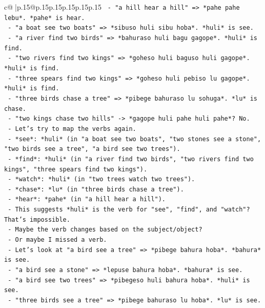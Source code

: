 \documentclass{article}
\begin{document}
{\begin{supertabular}{c@{$\;$}|p{.15\linewidth}@{}p{.15\linewidth}p{.15\linewidth}p{.15\linewidth}p{.15\linewidth}p{.15\linewidth}}
{{{\texttt{            {-} "a hill hear a hill" => *pahe pahe lebu*. *pahe* is hear.} \\
\texttt{            {-} "a boat see two boats" => *sibuso huli sibu hoba*. *huli* is see.} \\
\texttt{            {-} "a river find two birds" => *bahuraso huli bagu gagope*. *huli* is find.} \\
\texttt{            {-} "two rivers find two kings" => *goheso huli baguso huli gagope*. *huli* is find.} \\
\texttt{            {-} "three spears find two kings" => *goheso huli pebiso lu gagope*. *huli* is find.} \\
\texttt{            {-} "three birds chase a tree" => *pibege bahuraso lu sohuga*. *lu* is chase.} \\
\texttt{            {-} "two kings chase two hills" {-}> *gagope huli pahe huli pahe*? No.} \\
\texttt{            {-} Let's try to map the verbs again.} \\
\texttt{              {-} *see*: *huli* (in "a boat see two boats", "two stones see a stone", "two birds see a tree", "a bird see two trees").} \\
\texttt{              {-} *find*: *huli* (in "a river find two birds", "two rivers find two kings", "three spears find two kings").} \\
\texttt{              {-} *watch*: *huli* (in "two trees watch two trees").} \\
\texttt{              {-} *chase*: *lu* (in "three birds chase a tree").} \\
\texttt{              {-} *hear*: *pahe* (in "a hill hear a hill").} \\
\texttt{              {-} This suggests *huli* is the verb for "see", "find", and "watch"? That's impossible.} \\
\texttt{              {-} Maybe the verb changes based on the subject/object?} \\
\texttt{              {-} Or maybe I missed a verb.} \\
\texttt{              {-} Let's look at "a bird see a tree" => *pibege bahura hoba*. *bahura* is see.} \\
\texttt{              {-} "a bird see a stone" => *lepuse bahura hoba*. *bahura* is see.} \\
\texttt{              {-} "a bird see two trees" => *pibegeso huli bahura hoba*. *huli* is see.} \\
\texttt{              {-} "three birds see a tree" => *pibege bahuraso lu hoba*. *lu* is see.} \\
}}}
\end{supertabular}}
\end{document}

